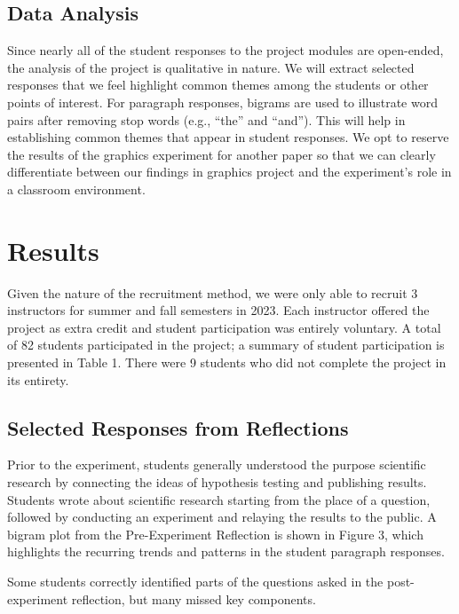 \documentclass[
]{article}
\begin{document}
\subsection{Data Analysis}\label{data-analysis}

Since nearly all of the student responses to the project modules are
open-ended, the analysis of the project is qualitative in nature. We
will extract selected responses that we feel highlight common themes
among the students or other points of interest. For paragraph responses,
bigrams are used to illustrate word pairs after removing stop words
(e.g., ``the'' and ``and''). This will help in establishing common
themes that appear in student responses. We opt to reserve the results
of the graphics experiment for another paper so that we can clearly
differentiate between our findings in graphics project and the
experiment's role in a classroom environment.

\section{Results}\label{results}

Given the nature of the recruitment method, we were only able to recruit
3 instructors for summer and fall semesters in 2023. Each instructor
offered the project as extra credit and student participation was
entirely voluntary. A total of 82 students participated in the project;
a summary of student participation is presented in Table 1. There were 9
students who did not complete the project in its entirety.

\subsection{Selected Responses from
Reflections}\label{selected-responses-from-reflections}

Prior to the experiment, students generally understood the purpose
scientific research by connecting the ideas of hypothesis testing and
publishing results. Students wrote about scientific research starting
from the place of a question, followed by conducting an experiment and
relaying the results to the public. A bigram plot from the
Pre-Experiment Reflection is shown in Figure 3, which highlights the
recurring trends and patterns in the student paragraph responses.

Some students correctly identified parts of the questions asked in the
post-experiment reflection, but many missed key components.
\end{document}
